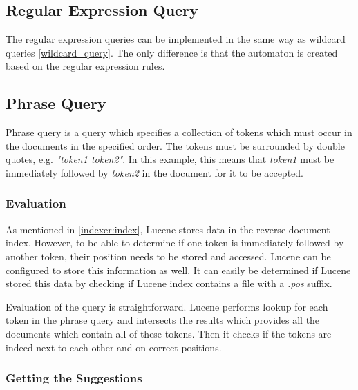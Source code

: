 \subsection{Regular Expression Query}
The regular expression queries can be implemented in the same way as wildcard queries \ref{wildcard_query}. The only difference
is that the automaton is created based on the regular expression rules.

\subsection{Phrase Query}
\label{suggest_phrase_query}
Phrase query is a query which specifies a collection of tokens which must occur in the documents in the specified order.
The tokens must be surrounded by double quotes, e.g. \textit{"token1 token2"}. In this example, this means that \textit{token1} must be immediately followed by
\textit{token2} in the document for it to be accepted.

\subsubsection{Evaluation}
\label{prefix_evaluation}
As mentioned in \ref{indexer:index},
Lucene stores data in the reverse document index. However, to be able to determine if one token is immediately followed by another
token, their position needs to be stored and accessed. Lucene can be configured to store this information as well.
It can easily be determined if Lucene stored this data by checking if Lucene index contains a file with a \textit{.pos}
suffix.

Evaluation of the query is straightforward. Lucene performs lookup for each token in the phrase query and intersects the
results which provides all the documents which contain all of these tokens. Then it checks if the tokens are indeed
next to each other and on correct positions.

\subsubsection{Getting the Suggestions}
